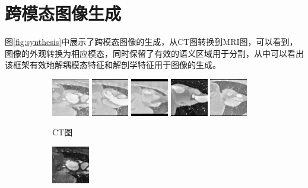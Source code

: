 \section{跨模态图像生成}
图\ref{fig:synthesis}中展示了跨模态图像的生成，从CT图转换到MRI图，可以看到，图像的外观转换为相应模态，同时保留了有效的语义区域用于分割，从中可以看出该框架有效地解耦模态特征和解剖学特征用于图像的生成。
\begin{figure}
    \centering
    \begin{subfigure}{\textwidth}
        \includegraphics[width=0.18\textwidth]{image/chap04/seg/1_125input_ct.png}
        \includegraphics[width=0.18\textwidth]{image/chap04/seg/1_150input_ct.png}
        \includegraphics[width=0.18\textwidth]{image/chap04/seg/1_185input_ct.png}
        \includegraphics[width=0.18\textwidth]{image/chap04/seg/2_156input_ct.png}
        \includegraphics[width=0.18\textwidth]{image/chap04/seg/3_150input_ct.png}
        \caption{CT图}
        \label{fig:ct}
    \end{subfigure}
    \vfill
    \begin{subfigure}{\textwidth}
        \includegraphics[width=0.18\textwidth]{image/chap04/seg/1_125fake_mr.png}

\end{subfigure}
\end{figure}
